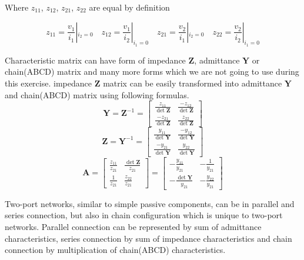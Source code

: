 \documentclass[notitlepage, a4paper, 11pt]{article}
\begin{document}
	Where $z_{11}$, $z_{12}$, $z_{21}$, $z_{22}$ are equal by definition
	
	\begin{equation}\label{eq:def}
		z_{11} = \frac{v_1}{i_1} |  _{i_2 = 0} \quad
		z_{12} = \frac{v_1}{i_2} |  _{i_1 = 0} \quad
		z_{21} = \frac{v_2}{i_1} |  _{i_2 = 0} \quad
		z_{22} = \frac{v_2}{i_2} |  _{i_1 = 0}
	\end{equation}

	Characteristic matrix can have form of impedance $\mathbf{Z}$, admittance $\mathbf{Y}$ or chain(ABCD) matrix and many more forms which we are not going to use during this exercise.	
	impedance $\mathbf{Z}$ matrix can be easily transformed into admittance $\mathbf{Y}$ and chain(ABCD) matrix using following formulas.
	\begin{equation}\label{eq:ZtoY}
		\mathbf{Y} = \mathbf{Z}^{-1} = 
		\begin{bmatrix}
			\frac{z_{11}}{\det\mathbf{Z}} & \frac{-z_{12}}{\det\mathbf{Z}} \\[4pt]
			\frac{-z_{21}}{\det\mathbf{Z}} & \frac{z_{22}}{\det\mathbf{Z}}
		\end{bmatrix}
	\end{equation}
	\begin{equation}\label{eq:YtoZ}
		\mathbf{Z} = \mathbf{Y}^{-1} = 
		\begin{bmatrix}
			\frac{y_{11}}{\det\mathbf{Y}} & \frac{-y_{12}}{\det\mathbf{Y}} \\[4pt]
			\frac{-y_{21}}{\det\mathbf{Y}} & \frac{y_{22}}{\det\mathbf{Y}}
		\end{bmatrix}
	\end{equation}
	\begin{equation}\label{eq:toA}
		\mathbf{A} =
		\begin{bmatrix}
			\frac{z_{11}}{z_{21}} & \frac{\det \mathbf{Z}}{z_{21}} \\[4pt]
			\frac{1}{z_{21}} & \frac{z_{22}}{z_{21}}
		\end{bmatrix}
		=
		\begin{bmatrix}
			-\frac{y_{11}}{y_{21}} & -\frac{1}{y_{21}} \\[4pt]
			-\frac{\det \mathbf{Y}}{y_{21}} & -\frac{y_{22}}{y_{21}}
		\end{bmatrix}
	\end{equation}

	Two-port networks, similar to simple passive components, can be in parallel and series connection, but also in chain configuration which is unique to two-port networks.
	Parallel connection can be represented by sum of admittance characteristics, series connection by sum of impedance characteristics and chain connection by multiplication of chain(ABCD) characteristics.%
		
\end{document}
